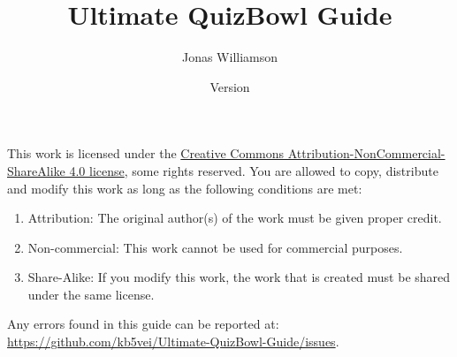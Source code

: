 \documentclass[12pt]{book}
\newcommand{\mytitle}{Ultimate QuizBowl Guide}
\begin{document}
	\frontmatter
	\title{\mytitle}

	
	\author{Jonas Williamson}
	\date{Version \the\year\the\month\the\day}
	\maketitle
	\begin{center}

			\huge \cc \the\year
			\vspace{0.5 in}
			
			\byncsa
	\normalsize
		\end{center}
		\vspace{2 in}	
	This work is licensed under the \href{https://creativecommons.org/licenses/by-nc-sa/4.0/legalcode}{Creative Commons Attribution-NonCommercial-ShareAlike 4.0 license}, some rights reserved.  You are allowed to copy, distribute and modify this work as long as the following conditions are met:
	\begin{enumerate}
		\item Attribution: The original author(s) of the work must be given proper credit.
		\item Non-commercial: This work cannot be used for commercial purposes.
		\item Share-Alike: If you modify this work, the work that is created must be shared under the same license. 
	\end{enumerate}

	\vspace{1 in}
	\begin{center} Any errors found in this guide can be reported at: \\ \href{https://github.com/kb5vei/Ultimate-QuizBowl-Guide/issues}{https://github.com/kb5vei/Ultimate-QuizBowl-Guide/issues}.\end{center}

\mainmatter


	
	
	
	
	
	
	\tableofcontents
	
	






	
	







	

		
	









		
		
	
		
\end{document}
